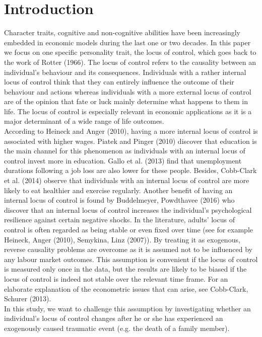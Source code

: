 \documentclass[12pt,a4paper,fleqn]{article}
\begin{document}
\section{Introduction}
Character traits, cognitive and non-cognitive abilities have been increasingly embedded in economic models during the last one or two decades. In this paper we focus on one specific personality trait, the locus of control, which goes back to the work of Rotter (1966). The locus of control refers to the causality between an individual's behaviour and its consequences. Individuals with a rather internal locus of control think that they can entirely influence the outcome of their behaviour and actions whereas individuals with a more external locus of control are of the opinion that fate or luck mainly determine what happens to them in life.
The locus of control is especially relevant in economic applications as it is a major determinant of a wide range of life outcomes. \\
According to Heineck and Anger (2010), having a more internal locus of control is associated with higher wages. Piatek and Pinger (2010) discover that education is the main channel for this phenomenon as individuals with an internal locus of control invest more in education. Gallo et al. (2013) find that unemployment durations following a job loss are also lower for these people. Besides, Cobb-Clark et al. (2014) observe that individuals with an internal locus of control are more likely to eat healthier and exercise regularly. Another benefit of having an internal locus of control is found by Buddelmeyer, Powdthavee (2016) who discover that an internal locus of control increases the individual's psychological resilience against certain negative shocks.
In the literature, adults' locus of control is often regarded as being stable or even fixed over time (see for example Heineck, Anger (2010), Semykina, Linz (2007)). By treating it as exogenous, reverse causality problems are overcome as it is assumed not to be influenced by any labour market outcomes. This assumption is convenient if the locus of control is measured only once in the data, but the results are likely to be biased if the locus of control is indeed not stable over the relevant time frame. For an elaborate explanation of the econometric issues that can arise, see Cobb-Clark, Schurer (2013). \\
In this study, we want to challenge this assumption by investigating whether an individual's locus of control changes after he or she has experienced an exogenously caused traumatic event (e.g. the death of a family member). \\
\end{document}
